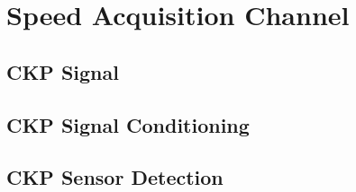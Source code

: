 \section{Speed Acquisition Channel}
			

	\subsection{CKP Signal}

	\subsection{CKP Signal Conditioning}

	\subsection{CKP Sensor Detection}
